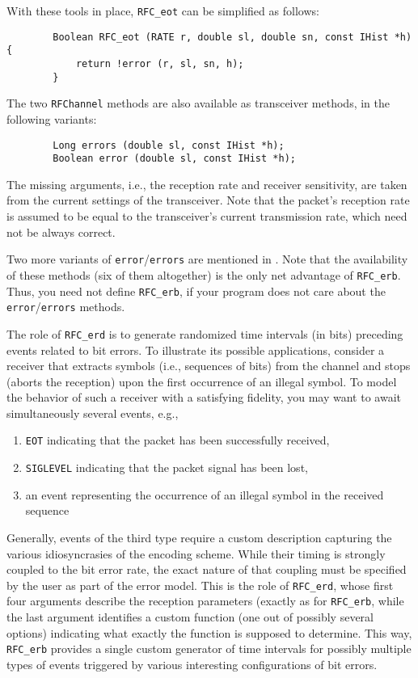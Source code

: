 With these tools in place, {\tt RFC\_eot} can be simplified as follows:
\begin{verbatim}
        Boolean RFC_eot (RATE r, double sl, double sn, const IHist *h) {
            return !error (r, sl, sn, h);
        }
\end{verbatim}

The two {\tt RFChannel} methods are also available as transceiver
methods, in the following variants:
\begin{verbatim}
        Long errors (double sl, const IHist *h);
        Boolean error (double sl, const IHist *h);
\end{verbatim}
\noindent
The missing arguments, i.e., the reception rate and receiver sensitivity,
are taken from the current settings of the transceiver.
Note that the packet's 
reception rate is assumed to be equal to the transceiver's current
transmission rate, which need not be always correct.

Two more variants of {\tt error}/{\tt errors} are mentioned in 
.
Note that the availability of
these methods (six of them altogether)
is the only net advantage of {\tt RFC\_erb}.
Thus, you need not define {\tt RFC\_erb}, if your
program does not care about the {\tt error}/{\tt errors} methods.

The role of {\tt RFC\_erd} is to generate randomized time intervals (in bits)
preceding events related to bit errors.
To illustrate its possible applications, consider a receiver that extracts
symbols (i.e., sequences of bits) from the channel and stops (aborts the
reception) upon the first occurrence of an illegal symbol.
To model the behavior of such a receiver with a satisfying fidelity, you may
want to await simultaneously several events, e.g.,
\begin{enumerate}
\item
{\tt EOT} indicating that the packet has been successfully received,
\item
{\tt SIGLEVEL} indicating that the packet signal has been lost,
\item
an event representing the occurrence of an illegal symbol in the received
sequence
\end{enumerate}

Generally, events of the third type require a custom description capturing
the various idiosyncrasies of the encoding scheme.
While their timing is strongly coupled to the bit error rate, the exact
nature of that coupling must be specified by the user as part of the 
error model.
This is the role of {\tt RFC\_erd}, whose first four arguments describe the
reception parameters (exactly as for {\tt RFC\_erb}, while the last argument
identifies a custom function (one out of possibly several options) indicating
what exactly the function is supposed to determine.
This way, {\tt RFC\_erb} provides a single custom generator of time intervals
for possibly multiple types of events triggered by various interesting
configurations of bit errors.

